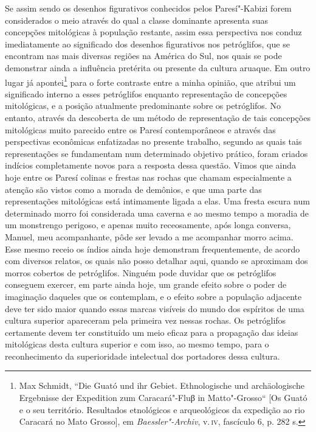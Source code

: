 Se assim sendo os desenhos figurativos conhecidos pelos Paresí"-Kabizi
forem considerados o meio através do qual a classe dominante apresenta
suas concepções mitológicas à população restante, assim essa
perspectiva nos conduz imediatamente ao significado dos desenhos
figurativos nos petróglifos, que se encontram nas mais diversas regiões
na América do Sul, nos quais se pode demonstrar ainda a influência
pretérita ou presente da cultura aruaque. Em outro lugar já
apontei\footnote{Max Schmidt, ``Die Guató und ihr Gebiet. Ethnologische
  und archäologische Ergebnisse der Expedition zum Caracará"-Fluβ in
  Matto"-Grosso`` {[}Os Guató e o seu território. Resultados etnológicos
  e arqueológicos da expedição ao rio Caracará no Mato Grosso{]}, em
  \emph{Baessler"-Archiv}, v.\,\textsc{iv}, fascículo 6, p. 282 s.} para o forte
contraste entre a minha opinião, que atribui um significado interno a
esses petróglifos enquanto representação de concepções mitológicas, e a
posição atualmente predominante sobre os petróglifos. No entanto,
através da descoberta de um método de representação de tais concepções
mitológicas muito parecido entre os Paresí contemporâneos e através das
perspectivas econômicas enfatizadas no presente trabalho, segundo as
quais tais representações se fundamentam num determinado objetivo
prático, foram criados indícios completamente novos para a resposta
dessa questão. Vimos que ainda hoje entre os Paresí colinas e frestas
nas rochas que chamam especialmente a atenção são vistos como a morada
de demônios, e que uma parte das representações mitológicas está
intimamente ligada a elas. Uma fresta escura num determinado morro foi
considerada uma caverna e ao mesmo tempo a moradia de um monstrengo
perigoso, e apenas muito receosamente, após longa conversa, Manuel, meu
acompanhante, pôde ser levado a me acompanhar morro acima. Esse mesmo
receio os índios ainda hoje demonstram frequentemente, de acordo com
diversos relatos, os quais não posso detalhar aqui, quando se aproximam
dos morros cobertos de petróglifos. Ninguém pode duvidar que os
petróglifos conseguem exercer, em parte ainda hoje, um grande efeito
sobre o poder de imaginação daqueles que os contemplam, e o efeito
sobre a população adjacente deve ter sido maior quando essas marcas
visíveis do mundo dos espíritos de uma cultura superior apareceram pela
primeira vez nessas rochas. Os petróglifos certamente devem ter
constituído um meio eficaz para a propagação das ideias mitológicas
desta cultura superior e com isso, ao mesmo tempo, para o reconhecimento
da superioridade intelectual dos portadores dessa cultura.



